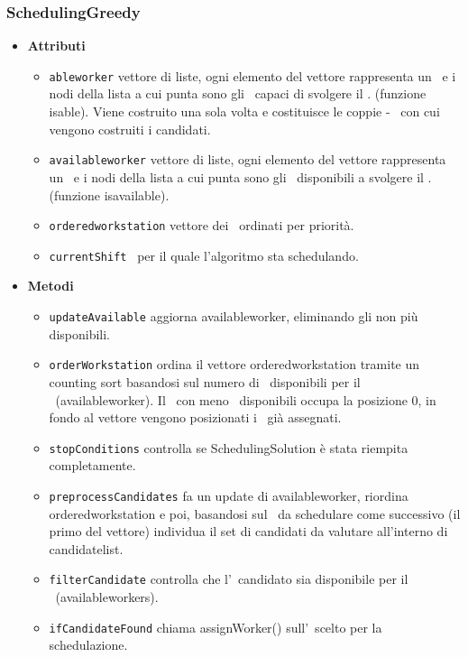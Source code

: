\subsubsection{SchedulingGreedy}
\begin{itemize}
    \item \textbf{Attributi}
    \begin{itemize}
        \item \texttt{able\textunderscore worker} vettore di liste, ogni elemento del vettore rappresenta un \task\ e i nodi della lista a cui punta sono gli \items\ capaci di svolgere il \task. (funzione is\textunderscore able). Viene costruito una sola volta e costituisce le coppie \items - \task\ con cui vengono costruiti i candidati.
        \item \texttt{available\textunderscore worker} vettore di liste, ogni elemento del vettore rappresenta un \task\ e i nodi della lista a cui punta sono gli \items\ disponibili a svolgere il \task. (funzione is\textunderscore available).
        \item \texttt{ordered\textunderscore workstation} vettore dei \task\ ordinati per priorità.
        \item \texttt{currentShift} \ttb\ per il quale l'algoritmo sta schedulando.
    \end{itemize}
    \item \textbf{Metodi}
    \begin{itemize}
        \item \texttt{updateAvailable} aggiorna available\textunderscore worker, eliminando gli \items non più disponibili.
        \item \texttt{orderWorkstation} ordina il vettore ordered\textunderscore workstation tramite un counting sort basandosi sul numero di \items\ disponibili per il \task\ (available\textunderscore worker). Il \task\ con meno \items\ disponibili occupa la posizione 0, in fondo al vettore vengono posizionati i \task\ già assegnati.
        \item \texttt{stopConditions} controlla se SchedulingSolution è stata riempita completamente.
        \item \texttt{preprocessCandidates} fa un update di available\textunderscore worker, riordina ordered\textunderscore workstation e poi, basandosi sul \task\ da schedulare come successivo (il primo del vettore) individua il set di candidati da valutare all'interno di candidate\textunderscore list.
        \item \texttt{filterCandidate} controlla che l'\items\ candidato sia disponibile per il \task\ (available\textunderscore workers).
        \item \texttt{ifCandidateFound} chiama assignWorker() sull'\items\ scelto per la schedulazione.
    \end{itemize}
\end{itemize}
